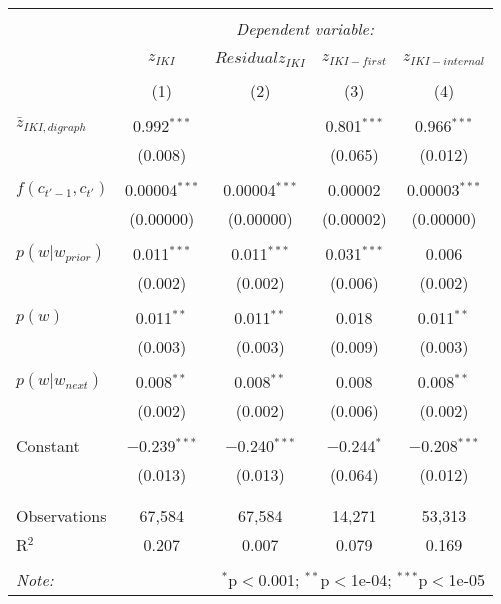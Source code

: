 
\begin{table*}[!htbp] \centering 
  \caption{} 
  \label{} 
\begin{tabular}{@{\extracolsep{5pt}}lcccc} 
\\[-1.8ex]\hline 
\hline \\[-1.8ex] 
 & \multicolumn{4}{c}{\textit{Dependent variable:}} \\ 
\cline{2-5} 
\\[-1.8ex] & $z_{IKI}$ & $Residual z_{IKI}$ & $z_{IKI-first}$ & $z_{IKI-internal}$ \\ 
\\[-1.8ex] & (1) & (2) & (3) & (4)\\ 
\hline \\[-1.8ex] 
 $\bar{z}_{IKI,digraph}$ & 0.992$^{***}$ &  & 0.801$^{***}$ & 0.966$^{***}$ \\ 
  & (0.008) &  & (0.065) & (0.012) \\ 
  & & & & \\ 
 $f(c_{t'-1},c_{t'})$ & 0.00004$^{***}$ & 0.00004$^{***}$ & 0.00002 & 0.00003$^{***}$ \\ 
  & (0.00000) & (0.00000) & (0.00002) & (0.00000) \\ 
  & & & & \\ 
 $p(w|w_{prior})$ & 0.011$^{***}$ & 0.011$^{***}$ & 0.031$^{***}$ & 0.006 \\ 
  & (0.002) & (0.002) & (0.006) & (0.002) \\ 
  & & & & \\ 
 $p(w)$ & 0.011$^{**}$ & 0.011$^{**}$ & 0.018 & 0.011$^{**}$ \\ 
  & (0.003) & (0.003) & (0.009) & (0.003) \\ 
  & & & & \\ 
 $p(w|w_{next})$ & 0.008$^{**}$ & 0.008$^{**}$ & 0.008 & 0.008$^{**}$ \\ 
  & (0.002) & (0.002) & (0.006) & (0.002) \\ 
  & & & & \\ 
 Constant & $-$0.239$^{***}$ & $-$0.240$^{***}$ & $-$0.244$^{*}$ & $-$0.208$^{***}$ \\ 
  & (0.013) & (0.013) & (0.064) & (0.012) \\ 
  & & & & \\ 
\hline \\[-1.8ex] 
Observations & 67,584 & 67,584 & 14,271 & 53,313 \\ 
R$^{2}$ & 0.207 & 0.007 & 0.079 & 0.169 \\ 
\hline 
\hline \\[-1.8ex] 
\textit{Note:}  & \multicolumn{4}{r}{$^{*}$p$<$0.001; $^{**}$p$<$1e-04; $^{***}$p$<$1e-05} \\ 
\end{tabular} 
\end{table*} 
